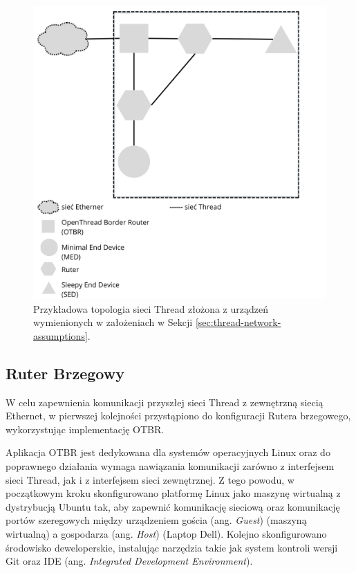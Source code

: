         \begin{figure}[H]
            \centering
            \includegraphics[width=0.8\linewidth]{graphics/thread-topology.png}
            \caption{Przykładowa topologia sieci Thread złożona z urządzeń wymienionych w założeniach w Sekcji \ref{sec:thread-network-assumptions}.}
            \label{fig:thread-topology}
        \end{figure}

    \subsection{Ruter Brzegowy}
    \label{subsec:otbr-implementation}

        W celu zapewnienia komunikacji przyszłej sieci Thread z zewnętrzną siecią Ethernet, w pierwszej kolejności przystąpiono do konfiguracji Rutera brzegowego, wykorzystując implementację OTBR. 
        
        Aplikacja OTBR jest dedykowana dla systemów operacyjnych Linux oraz do poprawnego działania wymaga nawiązania komunikacji zarówno z interfejsem sieci Thread, jak i z interfejsem sieci zewnętrznej. Z tego powodu, w początkowym kroku skonfigurowano platformę Linux jako maszynę wirtualną z dystrybucją Ubuntu tak, aby zapewnić komunikację sieciową oraz komunikację portów szeregowych między urządzeniem gościa (ang. \textit{Guest}) (maszyną wirtualną) a gospodarza (ang. \textit{Host}) (Laptop Dell). Kolejno skonfigurowano środowisko deweloperskie, instalując narzędzia takie jak system kontroli wersji Git oraz IDE (ang. \textit{Integrated Development Environment}). 


